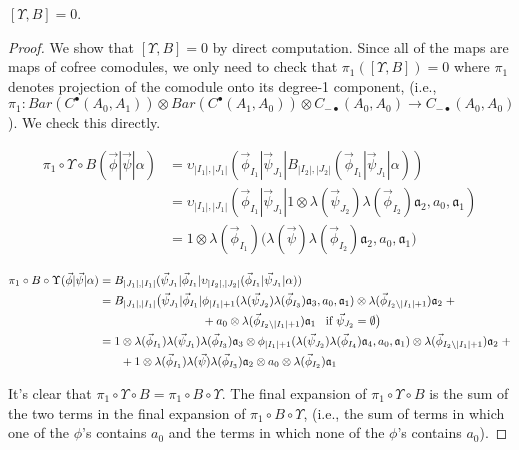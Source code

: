 \begin{prop}
$[\Upsilon, B] = 0$.
\end{prop}

\begin{proof}
We show that $[\Upsilon, B] = 0$ by direct computation. Since all of the maps are maps of cofree comodules, we only need to check that $\pi_1([\Upsilon, B]) = 0$ where $\pi_1$ denotes projection of the comodule onto its degree-1 component, (i.e., $\pi_1: Bar(C^\bullet(A_0, A_1)) \otimes Bar(C^\bullet(A_1, A_0)) \otimes C_{-\bullet}(A_0, A_0) \rightarrow C_{-\bullet}(A_0, A_0)$). We check this directly.

\begin{equation*}
\begin{aligned}
\pi_1 \circ \Upsilon \circ B (\vec{\phi} | \vec{\psi} | \alpha ) 
&= \upsilon_{|I_1|, |J_1|} (\vec{\phi}_{I_1} | \vec{\psi}_{J_1} | B_{|I_2|, |J_2|} (\vec{\phi}_{I_1} | \vec{\psi}_{J_1} | \alpha)) \\
&= \upsilon_{|I_1|, |J_1|} (\vec{\phi}_{I_1} | \vec{\psi}_{J_1} | 1 \otimes \lambda(\vec{\psi}_{J_2}) \lambda(\vec{\phi}_{I_2}) \mathfrak{a}_2, a_0, \mathfrak{a}_1) \\
&= 1 \otimes \lambda(\vec{\phi}_{I_1}) \big( \lambda(\vec{\psi}) \lambda(\vec{\phi}_{I_2}) \mathfrak{a}_2, a_0, \mathfrak{a}_1 \big)
\end{aligned}
\end{equation*}

\begin{align*}
\pi_1 \circ B \circ \Upsilon (\vec{\phi} | \vec{\psi} | \alpha ) 
&= B_{|J_1|, |I_1|} (\vec{\psi}_{J_1} | \vec{\phi}_{I_1} | \upsilon_{|I_2|, |J_2|} (\vec{\phi}_{I_1} | \vec{\psi}_{J_1} | \alpha)) \\
&= B_{|J_1|, |I_1|} \big(\vec{\psi}_{J_1} | \vec{\phi}_{I_1} | \phi_{|I_1|+1} (\lambda(\vec{\psi}_{J_2}) \lambda(\vec{\phi}_{I_3}) \mathfrak{a}_3, a_0, \mathfrak{a}_1) \otimes \lambda(\vec{\phi}_{I_2 \backslash |I_1| + 1}) \mathfrak{a}_2 \; + \\
&\hphantom{{}=B_{|J_1|, |I_1|} \big(\vec{\psi}_{J_1} | \vec{\phi}_{I_1} |} + a_0 \otimes \lambda(\vec{\phi}_{I_2 \backslash |I_1| + 1}) \mathfrak{a}_1 \; \; \; \text{if }\vec{\psi}_{J_2} = \emptyset \big) \\
&= 1 \otimes \lambda(\vec{\phi}_{I_1}) \lambda(\vec{\psi}_{J_1}) \lambda(\vec{\phi}_{I_3}) \mathfrak{a}_3 \otimes \phi_{|I_1|+1} (\lambda(\vec{\psi}_{J_2}) \lambda(\vec{\phi}_{I_4}) \mathfrak{a}_4, a_0, \mathfrak{a}_1) \otimes \lambda(\vec{\phi}_{I_2 \backslash |I_1| + 1}) \mathfrak{a}_2 \; + \\
&\hphantom{{}==} + 1 \otimes \lambda(\vec{\phi}_{I_1}) \lambda(\vec{\psi}) \lambda(\vec{\phi}_{I_3}) \mathfrak{a}_2 \otimes a_0 \otimes \lambda(\vec{\phi}_{I_2}) \mathfrak{a}_1
\end{align*}

It's clear that $\pi_1 \circ \Upsilon \circ B =  \pi_1 \circ B \circ \Upsilon$. The final expansion of $\pi_1 \circ \Upsilon \circ B$ is the sum of the two terms in the final expansion of $\pi_1 \circ B \circ \Upsilon$, (i.e., the sum of terms in which one of the $\phi$'s contains $a_0$ and the terms in which none of the $\phi$'s contains $a_0$).
\end{proof}